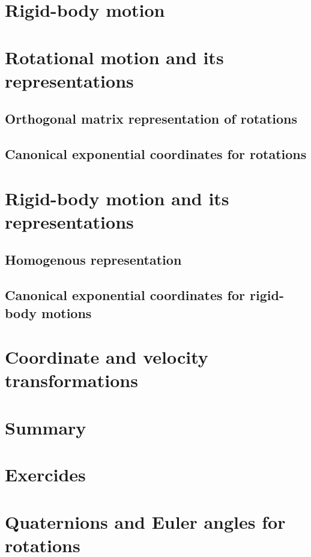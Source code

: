 \documentclass{book}
\begin{document}
\section{Rigid-body motion}

\section{Rotational motion and its representations}

\subsection{Orthogonal matrix representation of rotations}

\subsection{Canonical exponential coordinates for rotations}

\section{Rigid-body motion and its representations}

\subsection{Homogenous representation}

\subsection{Canonical exponential coordinates for rigid-body motions}

\section{Coordinate and velocity transformations}

\section{Summary}

\section{Exercides}

\section{Quaternions and Euler angles for rotations}
\end{document}
